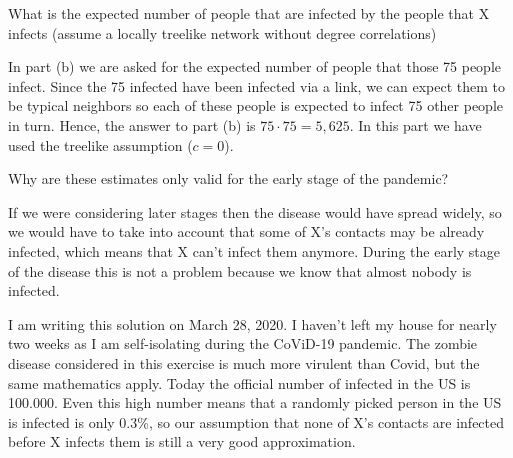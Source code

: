 \subquestion 
What is the expected number of people that are infected by the people that X infects (assume a locally treelike network without degree correlations) 

\solution
In part (b) we are asked for the expected number of people that those 75 people infect. Since the 75 infected have been infected via a link, we can expect them to be typical neighbors so each of these people is expected to infect 75 other people in turn. Hence, the answer to part (b) is $75\cdot75=5,625$. In this part we have used the treelike assumption ($c=0$).

\subquestion 
Why are these estimates only valid for the early stage of the pandemic?

\solution
If we were considering later stages then the disease would have spread widely, so we would have to take into account that some of X's contacts may be already infected, which means that X can't infect them anymore. During the early stage of the disease this is not a problem because we know that almost nobody is infected. 

I am writing this solution on March 28, 2020. I haven't left my house for nearly two weeks as I am self-isolating during the CoViD-19 pandemic. The zombie disease considered in this exercise is much more virulent than Covid, but the same mathematics apply. Today the official number of infected in the US is 100.000. Even this high number means that a randomly picked person in the US is infected is only 0.3\%, so our assumption that none of X's contacts are infected before X infects them is still a very good approximation. 